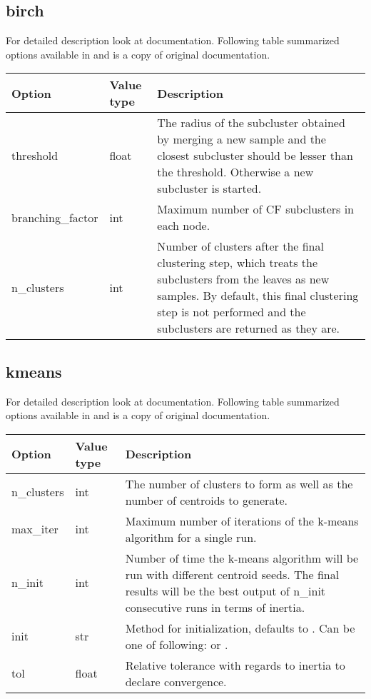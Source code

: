 \documentclass[a4paper,10pt,english]{sphinxmanual}
\begin{document}
\subsection{birch}
\label{valve/valve_config:birch}
For detailed description look at \href{http://scikit-learn.org/stable/modules/generated/sklearn.cluster.Birch.html\#sklearn.cluster.Birch}{} documentation. Following table summarized options available in  and is a copy of original documentation.

\begin{tabulary}{\linewidth}{|L|L|L|}
\hline
\textsf{\relax 
Option
} & \textsf{\relax 
Value type
} & \textsf{\relax 
Description
}\\
\hline
threshold
 & 
float
 & 
The radius of the subcluster obtained by merging a new sample
and the closest subcluster should be lesser than the threshold.
Otherwise a new subcluster is started.
\\
\hline
branching\_factor
 & 
int
 & 
Maximum number of CF subclusters in each node.
\\
\hline
n\_clusters
 & 
int
 & 
Number of clusters after the final clustering step, which
treats the subclusters from the leaves as new samples. By
default, this final clustering step is not performed and the
subclusters are returned as they are.
\\
\hline\end{tabulary}



\subsection{kmeans}
\label{valve/valve_config:kmeans}
For detailed description look at \href{http://scikit-learn.org/stable/modules/generated/sklearn.cluster.KMeans.html\#sklearn.cluster.KMeans}{} documentation. Following table summarized options available in  and is a copy of original documentation.

\begin{tabulary}{\linewidth}{|L|L|L|}
\hline
\textsf{\relax 
Option
} & \textsf{\relax 
Value type
} & \textsf{\relax 
Description
}\\
\hline
n\_clusters
 & 
int
 & 
The number of clusters to form as well as the number of
centroids to generate.
\\
\hline
max\_iter
 & 
int
 & 
Maximum number of iterations of the k-means algorithm for a
single run.
\\
\hline
n\_init
 & 
int
 & 
Number of time the k-means algorithm will be run with different
centroid seeds. The final results will be the best output of
n\_init consecutive runs in terms of inertia.
\\
\hline
init
 & 
str
 & 
Method for initialization, defaults to . Can be
one of following:  or .
\\
\hline
tol
 & 
float
 & 
Relative tolerance with regards to inertia to declare
convergence.
\\
\hline\end{tabulary}
\end{document}

